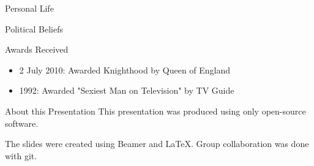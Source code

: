 \documentclass[xcolor=dvipsnames]{beamer}
\begin{document}
\begin{frame}{Personal Life}
  \begin{itemize}
  \end{itemize}
\end{frame}

\begin{frame}{Political Beliefs}

\end{frame}

\begin{frame}{Awards Received}
  \begin{itemize}
    \item 2 July 2010: Awarded Knighthood by Queen of England
    \item 1992: Awarded "Sexiest Man on Television" by TV Guide
  \end{itemize}
\end{frame}
\begin{frame}{About this Presentation}
  This presentation was produced using only open-source software.

  The slides were created using Beamer and LaTeX.
  Group collaboration was done with git.
\end{frame}
\end{document}
